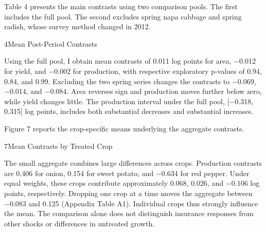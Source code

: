 
Table 4 presents the main contrasts using two comparison pools. The first includes the full pool. The second excludes spring napa cabbage and spring radish, whose survey method changed in 2012.

\begin{wordtable}{4}{Mean Post-Period Contrasts}

\end{wordtable}

Using the full pool, I obtain mean contrasts of 0.011 log points for area, −0.012 for yield, and −0.002 for production, with respective exploratory p-values of 0.94, 0.84, and 0.99. Excluding the two spring series changes the contrasts to −0.069, −0.014, and −0.084. Area reverses sign and production moves further below zero, while yield changes little. The production interval under the full pool, [−0.318, 0.315] log points, includes both substantial decreases and substantial increases.

Figure 7 reports the crop-specific means underlying the aggregate contrasts.

\begin{wordfigure}{7}{Mean Contrasts by Treated Crop}
\end{wordfigure}

The small aggregate combines large differences across crops. Production contrasts are 0.406 for onion, 0.154 for sweet potato, and −0.634 for red pepper. Under equal weights, these crops contribute approximately 0.068, 0.026, and −0.106 log points, respectively. Dropping one crop at a time moves the aggregate between −0.083 and 0.125 (Appendix Table A1). Individual crops thus strongly influence the mean. The comparison alone does not distinguish insurance responses from other shocks or differences in untreated growth.

